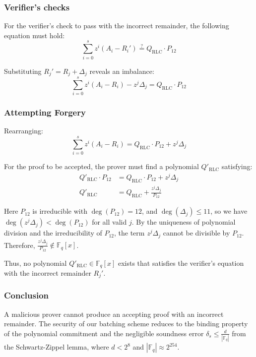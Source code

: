 \subsubsection{Verifier's checks}

For the verifier's check to pass with the incorrect remainder, the following equation must hold:
$$\sum_{i=0}^{s} z^i(A_i - R_i') \stackrel{?}{=} Q_{\text{RLC}} \cdot P_{12}$$

Substituting $R_j' = R_j + \Delta_j$ reveals an imbalance:
$$\sum_{i=0}^{s} z^i(A_i - R_i) - z^j\Delta_j = Q_{\text{RLC}} \cdot P_{12}$$

\subsubsection{Attempting Forgery}

Rearranging:
$$\sum_{i=0}^{s} z^i(A_i - R_i) = Q_{\text{RLC}} \cdot P_{12} + z^j\Delta_j$$

For the proof to be accepted, the prover must find a polynomial $Q'_{\text{RLC}}$ satisfying:
\begin{align*}
Q'_{\text{RLC}} \cdot P_{12} &= Q_{\text{RLC}} \cdot P_{12} + z^j\Delta_j \\
Q'_{\text{RLC}} &= Q_{\text{RLC}} + \frac{z^j\Delta_j}{P_{12}}
\end{align*}

Here $P_{12}$ is irreducible with $\deg(P_{12}) = 12$, and $\deg(\Delta_j) \leq 11$, so we have $\deg(z^j\Delta_j) < \deg(P_{12})$ for all valid $j$. By the uniqueness of polynomial division and the irreducibility of $P_{12}$, the term $z^j\Delta_j$ cannot be divisible by $P_{12}$. \\ Therefore, $\frac{z^j\Delta_j}{P_{12}} \notin \mathbb{F}_q[x]$.

Thus, no polynomial $Q'_{\text{RLC}} \in \mathbb{F}_q[x]$ exists that satisfies the verifier's equation with the incorrect remainder $R_j'$.

\subsubsection{Conclusion}

A malicious prover cannot produce an accepting proof with an incorrect remainder. The security of our batching scheme reduces to the binding property of the polynomial commitment and the negligible soundness error $\delta_s \leq \frac{d}{|\mathbb{F}_q|}$ from the Schwartz-Zippel lemma, where $d < 2^8$ and $|\mathbb{F}_q| \approx 2^{254}$.


